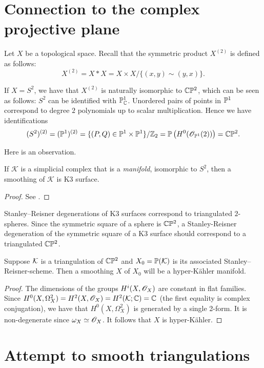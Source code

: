 \section{Connection to the complex projective plane}

Let $X$ be a topological space. Recall that the symmetric product $X^{(2)}$ is defined as follows:
\[
X^{(2)} = X \ast X = X \times X / \{ (x,y) \sim (y,x) \}.
\]

If $X=S^2$, we have that $X^{(2)}$ is naturally isomorphic to $\C \P^2$, which can be seen as follows: $S^2$ can be identified with $\P^1_\C$. Unordered pairs of points in $\P^1$ correspond to degree $2$ polynomials up to scalar multiplication. Hence we have identifications
$$
(S^2)^{(2)} = (\P^1)^{(2)} = \{ (P,Q) \in \P^1 \times \P^1 \} / \Z_2 = \P\left( H^0(\OO_{\P^1}(2)) \right)=\C \P^2.
$$

Here is an observation.

\begin{lemma}
If $\mathcal K$ is a simplicial complex that is a \emph{manifold}, isomorphic to $S^2$, then a smoothing of $\mathcal K$ is K3 surface.
\end{lemma}
\begin{proof}
See \cite{eisenbud_graphcurves}.
\end{proof}

Stanley--Reisner degenerations of K3 surfaces correspond to triangulated $2$-spheres. Since the symmetric square of a sphere is $\C \P ^2$, a Stanley-Reisner degeneration of the symmetric square of a K3 surface should correspond to a triangulated $\C \P^2$. 

\begin{proposition}
Suppose $\K$ is a triangulation of $\C \P^2$ and $X_0=\P(\K)$ is its associated Stanley--Reisner-scheme. Then a smoothing $X$ of $X_0$ will be a hyper-Kähler manifold.
\end{proposition}
\begin{proof}
The dimensions of the groups $H^i(X,\OO_X)$ are constant in flat families. Since $H^0(X,\Omega^2_X)=H^2(X,\OO_X)=H^2(\K;\C)=\C$ (the first equality is complex conjugation), we have that $H^0(X,\Omega^2_X)$ is generated by a single 2-form. It is non-degenerate since $\omega_X \simeq \OO_X$. It follows that $X$ is hyper-Kähler.
\end{proof}

\section{Attempt to smooth triangulations}

